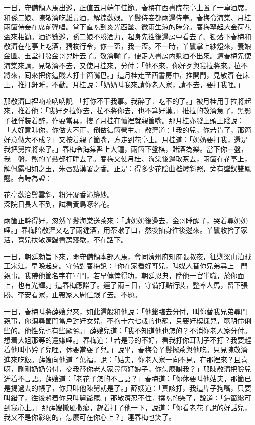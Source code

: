 一日，守備領人馬出巡，正值五月端午佳節。春梅在西書院花亭上置了一卓酒席，和孫二娘、陳敬濟吃雄黃酒，解粽歡娛。{}丫鬟侍妾都兩邊侍奉。春梅令海棠、月桂兩箇侍妾在席前彈唱。當下直吃到炎光西墜、微雨生涼的時分。春梅拏起大金荷花盃來相勸。酒過數巡，孫二娘不勝酒力，起身先徃後邊房中看去了。獨落下春梅和敬濟在花亭上吃酒，猜枚行令，你一盃，我一盃。不一時，丫鬟掌上紗燈來，養娘金匱、玉堂打發金哥兒睡去了。敬濟輸了，便走入書房內躲酒不出來。這春梅先使海棠來請，見敬濟不去，又使月桂來，分付：「他不來，你好歹與我拉將來。拉不將來，囘來把你這賤人打十箇嘴巴。」這月桂走至西書房中，推開門，見敬濟𢱉在床上，推打鼾睡，不動。月桂說：「奶奶叫我來請你老人家，請不去，要打我哩。」

那敬濟口裡喃喃吶吶說：「打你不干我事。{}我醉了，吃不的了。」被月桂用手拉將起來，推着他：「我好歹拉你去，拉不將你去，也不算好漢。」推拉的敬濟急了，黑影子裡佯裝着醉，作耍當真，摟了月桂在懷裡就親箇嘴。那月桂亦發上頭上腦說：「人好意叫你，你做大不正，倒做這箇營生。」敬濟道：「我的兒，你若肯了，那箇好意做大不成？」又按着親了箇嘴，方走到花亭上。月桂道：「奶奶要打我，還是我把舅拉將來了。」春梅令海棠斟上大鐘，兩箇下盤棋，賭酒為樂。當下你一盤，我一盤，熬的丫鬟都打睡去了。春梅又使月桂、海棠後邊取茶去，兩箇在花亭上，解佩露相如之玉，朱唇點漢署之香。正是：得多少花陰曲檻燈斜照，旁有墜釵雙鳳翹。有詩為證：

\begin{myquote}
花亭歡洽鬂雲斜，粉汗凝香沁絳紗。\\深院日長人不到，試看黃鳥啄名花。
\end{myquote}

兩箇正幹得好，忽然丫鬟海棠送茶來：「請奶奶後邊去，金哥睡醒了，哭着尋奶奶哩。」春梅陪敬濟又吃了兩鍾酒，用茶嗽了口，然後抽身徃後邊來。丫鬟收拾了家活，喜兒扶敬濟歸書房寢歇，不在話下。

一日，朝廷勑旨下來，命守備領本部人馬，會同濟州府知府張叔夜，征剿梁山泊賊王宋江，早晚起身。守備對春梅說：「你在家看好哥兒，叫媒人替你兄弟尋上一門親事。我帶他箇名字在軍門，若早僥倖得功，朝廷恩典，陞他一官半職，於你面上，也有光輝。」{}這春梅應諾了。遲了兩三日，守備打點行裝，整率人馬，留下張勝、李安看家，止帶家人周仁跟了去。不題。

一日，春梅叫將薛嫂兒來，如此這般和他說：「他爺臨去分付，叫你替我兄弟尋門親事，你須尋箇門當戶對好女兒，不拘十六七歲的也罷，只要好模樣兒，聰明伶俐些的。他性兒也有些厥劣。」薛嫂兒道：「我不知道他也怎的？不消你老人家分付。想着大姐那等的還嫌哩。」春梅道：「若是尋的不好，看我打你耳刮子不打？我要趕着他叫小妗子兒哩，休要當耍子兒。」說畢，春梅令丫鬟擺茶與他吃。只見陳敬濟進來吃飯。薛嫂向他道了萬福，說：「姑夫，你老人家一向不見，在那裡來？且喜呀，剛剛奶奶分付，交我替你老人家尋箇好娘子，你怎麼謝我？」那陳敬濟把臉兒迸着不言語。{}薛嫂道：「老花子怎的不言語？」春梅道：「你休要叫他姑夫，那箇已是揭過去的帳了，你只叫他陳舅就是了。」薛嫂道：「真該打，我這片子狗嘴，只要叫錯了，徃後趕着你只叫舅爺罷。」那敬濟忍不住，撲吃的笑了，說道：「這箇纔可到我心上。」{}那薛嫂撒風撒癡，趕着打了他一下，說道：「你看老花子說的好話兒，我又不是你影射的，怎麼可在你心上？」連春梅也笑了。

